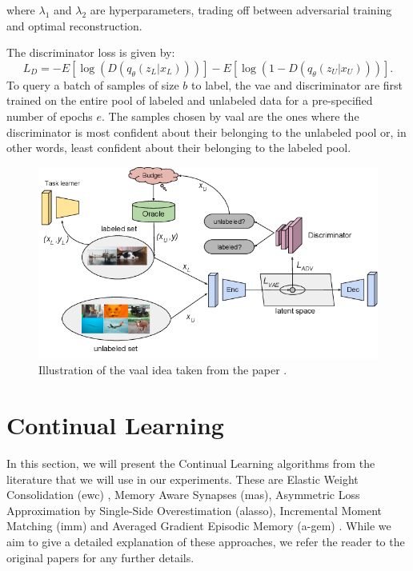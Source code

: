 where $\lambda_1$ and $\lambda_2$ are hyperparameters, trading off between adversarial training and optimal reconstruction. \par
The discriminator loss is given by:
\begin{equation}
    L_D = - E[\log(D(q_\theta (z_L | x_L)))] - E[\log (1- D(q_\theta (z_U | x_U)))].
\end{equation}
To query a batch of samples of size $b$ to label, the \gls{vae} and discriminator are first trained on the entire pool of labeled and unlabeled data for a
pre-specified number of epochs $e$. The samples chosen by \gls{vaal} are the ones where the discriminator is most confident about their belonging to the unlabeled
pool or, in other words, least confident about their belonging to the labeled pool.
\begin{figure} [ht]
    \centering
    \includegraphics[width=.9\linewidth]{images/Vaal_idea.png}
    \caption[Visualization of VAAL]{Illustration of the \gls{vaal} idea taken from the paper \cite{sinha2019variational}.}
    \label{fig:VAAL}
\end{figure}


\section{Continual Learning}
\label{sec:Related_work:Continual_Learning}
In this section, we will present the Continual Learning algorithms from the literature that we will use in our experiments. These are Elastic Weight
Consolidation (\gls{ewc}) \cite{kirkpatrick2017overcoming}, Memory Aware Synapses (\gls{mas}), Asymmetric Loss Approximation by Single-Side Overestimation
(\gls{alasso}), Incremental Moment Matching (\gls{imm}) and Averaged Gradient Episodic Memory (\gls{a-gem}) \cite{lopez2017gradient}. While we aim to give
a detailed explanation of these approaches, we refer the reader to the original papers for any further details. \par


